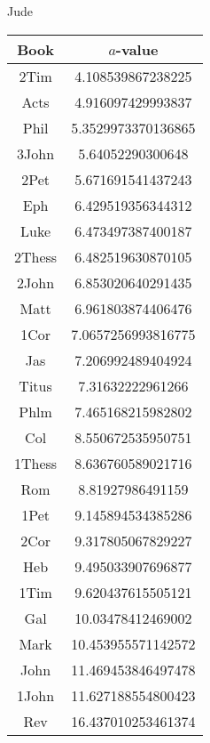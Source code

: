 \documentclass[12pt,letterpaper]{article}
\begin{document}
Jude
\begin{longtable}{|c|c|}
\hline
 Book & $a$-value \\ \hline
2Tim & 4.108539867238225 \\ \hline
 Acts & 4.916097429993837 \\ \hline
 Phil & 5.3529973370136865 \\ \hline
 3John & 5.64052290300648 \\ \hline
 2Pet & 5.671691541437243 \\ \hline
 Eph & 6.429519356344312 \\ \hline
 Luke & 6.473497387400187 \\ \hline
 2Thess & 6.482519630870105 \\ \hline
 2John & 6.853020640291435 \\ \hline
 Matt & 6.961803874406476 \\ \hline
 1Cor & 7.0657256993816775 \\ \hline
 Jas & 7.206992489404924 \\ \hline
 Titus & 7.31632222961266 \\ \hline
 Phlm & 7.465168215982802 \\ \hline
 Col & 8.550672535950751 \\ \hline
 1Thess & 8.636760589021716 \\ \hline
 Rom & 8.81927986491159 \\ \hline
 1Pet & 9.145894534385286 \\ \hline
 2Cor & 9.317805067829227 \\ \hline
 Heb & 9.495033907696877 \\ \hline
 1Tim & 9.620437615505121 \\ \hline
 Gal & 10.03478412469002 \\ \hline
 Mark & 10.453955571142572 \\ \hline
 John & 11.469453846497478 \\ \hline
 1John & 11.627188554800423 \\ \hline
 Rev & 16.437010253461374 \\ \hline 
\end{longtable}
\end{document}

